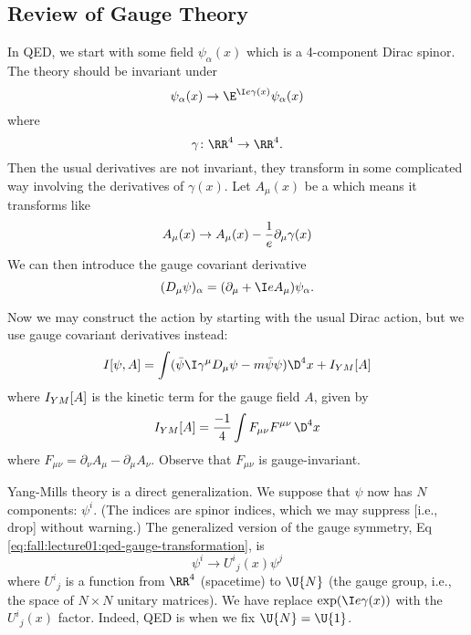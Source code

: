 \lecture{}
\subsection{Review of Gauge Theory}
In QED, we start with some field $\psi_{\alpha}(x)$ which is a
4-component Dirac spinor. The theory should be invariant under
\begin{equation}\label{eq:fall:lecture01:qed-gauge-transformation}
  \psi_{\alpha}(x)\to\E^{\I\elementarycharge\gamma(x)}\psi_{\alpha}(x)
\end{equation}
where
\begin{equation}
  \gamma\colon\RR^4\to\RR^4.
\end{equation}
Then the usual derivatives are not invariant, they transform in some
complicated way involving the derivatives of $\gamma(x)$. Let
$A_{\mu}(x)$ be a  which means it transforms like
\begin{equation}
  A_{\mu}(x) \to A_{\mu}(x) - \frac{1}{\text{\ensuremath{e}}}\partial_{\mu}\gamma(x)
\end{equation}
We can then introduce the gauge covariant derivative
\begin{equation}
  (\gaugeDerivative_{\mu}\psi)_{\alpha}
  = (\partial_{\mu} + \I\elementarycharge A_{\mu})\psi_{\alpha}.
\end{equation}

Now we may construct the action by starting with the usual Dirac action,
but we use gauge covariant derivatives instead:
\begin{equation}
  \action[\psi, A] =
  \int(\bar{\psi}\I\gamma^{\mu}\gaugeDerivative_{\mu}\psi
       - m\bar{\psi}\psi)\D^{4}x + \action_{YM}[A]
\end{equation}
where $I_{YM}[A]$ is the kinetic term for the gauge field $A$,
given by
\begin{equation}
  \action_{YM}[A] = \frac{-1}{4}\int F_{\mu\nu}F^{\mu\nu}\,\D^{4}x
\end{equation}
where $F_{\mu\nu} = \partial_{\nu}A_{\mu} - \partial_{\mu}A_{\nu}$.
Observe that $F_{\mu\nu}$ is gauge-invariant.

Yang-Mills theory is a direct generalization. We suppose that $\psi$ now
has $N$ components: $\psi^{i}$. (The indices are spinor indices, which
we may suppress [i.e., drop] without warning.) The generalized version
of the gauge symmetry, Eq \eqref{eq:fall:lecture01:qed-gauge-transformation}, is
\begin{equation}
  \psi^{i}\to{U^{i}}_{j}(x)\psi^{j}
\end{equation}
where ${U^{i}}_{j}$ is a function from $\RR^{4}$ (spacetime) to $\U{N}$
(the gauge group, i.e., the space of $N\times N$ unitary matrices). We
have replace $\exp(\I\elementarycharge\gamma(x))$ with the ${U^{i}}_{j}(x)$
factor. Indeed, QED is when we fix $\U{N}=\U{1}$. 

